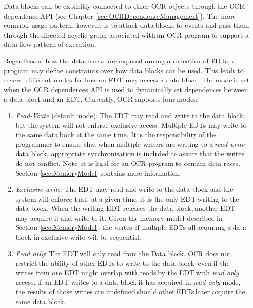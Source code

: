 Data blocks can be explicitly connected to other OCR objects through the OCR
dependence API (see Chapter~\ref{sec:OCRDependenceManagement}).
The more common usage pattern, however, is
to attach data blocks to events and pass them through the
directed acyclic graph associated with an OCR program to support a
data-flow pattern of execution.

Regardless of how the data blocks are exposed among a collection of
EDTs, a program may define constraints over how data
blocks can be used. This leads to several different modes for how an
EDT may access a data block. The mode is set when the OCR dependences
API is used to dynamically set dependences between a data block and an
EDT. Currently, OCR supports four modes:
\begin{enumerate}
\item \emph{Read-Write} (default mode): The EDT may read
  and write to the data block, but the system will not enforce exclusive
  access. Multiple EDTs may write to the same data bock at the same
  time. It is the responsibility of the programmer to
  ensure that when multiple writers are writing to a \emph{read-write} data block,
  appropriate synchronization
  is included to assure that the writes do not conflict.  Note: it is
  legal for an OCR program to contain data
  races. Section~\ref{sec:MemoryModel} contains more information.

\item \emph{Exclusive write}: The
  EDT may read and write to the data block and the system will enforce
  that, at a given time, it is the only EDT writing to the data
  block. When the writing EDT releases the data block, another EDT may
  acquire it and write to it. Given the memory model described in
  Section~\ref{sec:MemoryModel}, the writes of multiple EDTs all
  acquiring a data block in exclusive write will be sequential.

\item \emph{Read only}: The EDT
  will only read from the Data block. OCR does
  not restrict the ability of other EDTs to write to the data block,
  even if the writes from one EDT might overlap with reads by the EDT
  with \emph{read only} access. If an EDT writes to a data block
  it has acquired in \emph{read only} mode, the results of those writes are
  undefined should other EDTs later acquire the same data block.


\end{enumerate}
